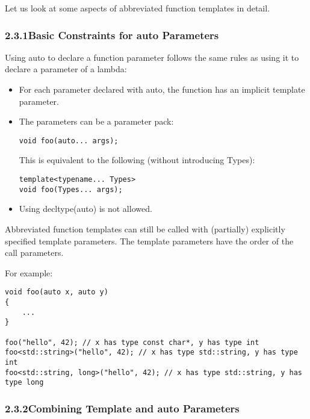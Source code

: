 
Let us look at some aspects of abbreviated function templates in detail.

\subsubsection*{ 2.3.1\hspace{0.2cm}Basic Constraints for auto Parameters}

Using auto to declare a function parameter follows the same rules as using it to declare a parameter of a lambda:

\begin{itemize}
\item
For each parameter declared with auto, the function has an implicit template parameter.

\item
The parameters can be a parameter pack:
\begin{lstlisting}[style=styleCXX]
void foo(auto... args);
\end{lstlisting}

This is equivalent to the following (without introducing Types):
\begin{lstlisting}[style=styleCXX]
template<typename... Types>
void foo(Types... args);
\end{lstlisting}

\item
Using decltype(auto) is not allowed.
\end{itemize}

Abbreviated function templates can still be called with (partially) explicitly specified template parameters. The template parameters have the order of the call parameters.

For example:

\begin{lstlisting}[style=styleCXX]
void foo(auto x, auto y)
{
	...
}

foo("hello", 42); // x has type const char*, y has type int
foo<std::string>("hello", 42); // x has type std::string, y has type int
foo<std::string, long>("hello", 42); // x has type std::string, y has type long
\end{lstlisting}

\subsubsection*{ 2.3.2\hspace{0.2cm}Combining Template and auto Parameters}

